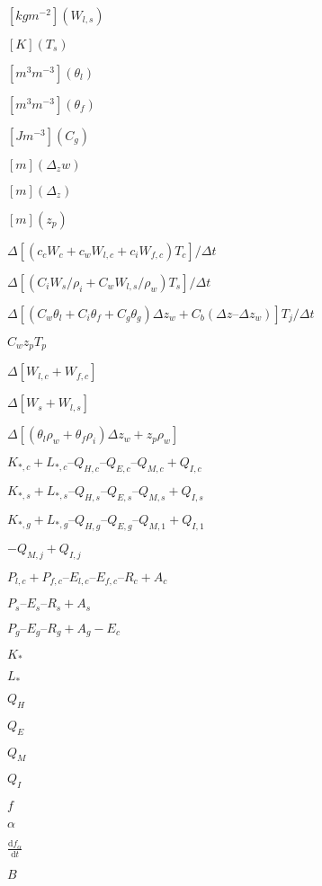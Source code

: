 \documentclass{article}
\begin{document}
$[kg m^{-2}] (W_{l,s})$
\pagebreak

$[K] (T_s)$
\pagebreak

$[m^3 m^{-3}] (\theta_l)$
\pagebreak

$[m^3 m^{-3}] (\theta_f)$
\pagebreak

$[J m^{-3}] (C_g)$
\pagebreak

$[m] (\Delta_zw)$
\pagebreak

$[m] (\Delta_z)$
\pagebreak

$[m] (z_p)$
\pagebreak

$\Delta [(c_c W_c + c_w W_{l,c} + c_i W_{f,c} )T_c ] / \Delta t$
\pagebreak

$\Delta [(C_i W_s /\rho_i + C_w W_{l,s} / \rho_w )T_s ]/ \Delta t $
\pagebreak

$\Delta {[(C_w \theta_l + C_i \theta_f + C_g \theta_g ) \Delta z_w + C_b (\Delta z – \Delta z_w )]T_j }/ \Delta t$
\pagebreak

$C_w z_p T_p$
\pagebreak

$\Delta[W_{l,c} + W_{f,c}]$
\pagebreak

$\Delta[W_s + W_{l,s}]$
\pagebreak

$\Delta [(\theta_l \rho_w + \theta_f \rho_i ) \Delta z_w + z_p \rho_w ]$
\pagebreak

$K_{*,c} + L_{*,c} – Q_{H,c} – Q_{E,c} – Q_{M,c} + Q_{I,c}$
\pagebreak

$K_{*,s} + L_{*,s} – Q_{H,s} – Q_{E,s} – Q_{M,s} + Q_{I,s}$
\pagebreak

$K_{*,g} + L_{*,g} – Q_{H,g} – Q_{E,g} – Q_{M,1} + Q_{I,1}$
\pagebreak

$- Q_{M,j} + Q_{I,j}$
\pagebreak

$P_{l,c} + P_{f,c} – E_{l,c} – E_{f,c} – R_c + A_c$
\pagebreak

$P_s – E_s – R_s + A_s$
\pagebreak

$P_g – E_g – R_g + A_g - E_c$
\pagebreak

$K_*$
\pagebreak

$L_*$
\pagebreak

$Q_H$
\pagebreak

$Q_E$
\pagebreak

$Q_M$
\pagebreak

$Q_I$
\pagebreak

$f$
\pagebreak

$\alpha$
\pagebreak

$\frac{\mathrm{d}f_\alpha}{\mathrm{d}t}$
\pagebreak

$B$
\pagebreak
\end{document}
